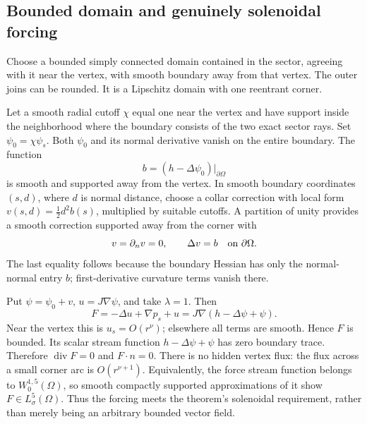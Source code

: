 \documentclass[10pt]{article}
\begin{document}
\subsection*{Bounded domain and genuinely solenoidal forcing}
Choose a bounded simply connected domain contained in the sector, agreeing with it near the vertex, with smooth boundary away from that vertex. The outer joins can be rounded. It is a Lipschitz domain with one reentrant corner.\par
Let a smooth radial cutoff \(\chi\) equal one near the vertex and have support inside the neighborhood where the boundary consists of the two exact sector rays. Set \(\psi_0=\chi\psi_s\). Both \(\psi_0\) and its normal derivative vanish on the entire boundary. The function \[b=(h-\Delta\psi_0)|_{\partial\Omega}\] is smooth and supported away from the vertex. In smooth boundary coordinates \((s,d)\), where \(d\) is normal distance, choose a collar correction with local form \(v(s,d)=\tfrac12d^2b(s)\), multiplied by suitable cutoffs. A partition of unity provides a smooth correction supported away from the corner with \[v=\partial_n v=0,\qquad \Delta v=b
 \quad\hbox{on }\partial\Omega.\] The last equality follows because the boundary Hessian has only the normal-normal entry \(b\); first-derivative curvature terms vanish there.\par
Put \(\psi=\psi_0+v\), \(u=J\nabla\psi\), and take \(\lambda=1\). Then \[F=-\Delta u+\nabla p_s+u
   =J\nabla(h-\Delta\psi+\psi).\] Near the vertex this is \(u_s=O(r^\nu)\); elsewhere all terms are smooth. Hence \(F\) is bounded. Its scalar stream function \(h-\Delta\psi+\psi\) has zero boundary trace. Therefore \(\operatorname{div}F=0\) and \(F\cdot n=0\). There is no hidden vertex flux: the flux across a small corner arc is \(O(r^{\nu+1})\). Equivalently, the force stream function belongs to \(W^{1,5}_0(\Omega)\), so smooth compactly supported approximations of it show \(F\in L^5_\sigma(\Omega)\). Thus the forcing meets the theorem’s solenoidal requirement, rather than merely being an arbitrary bounded vector field.\par
\end{document}
